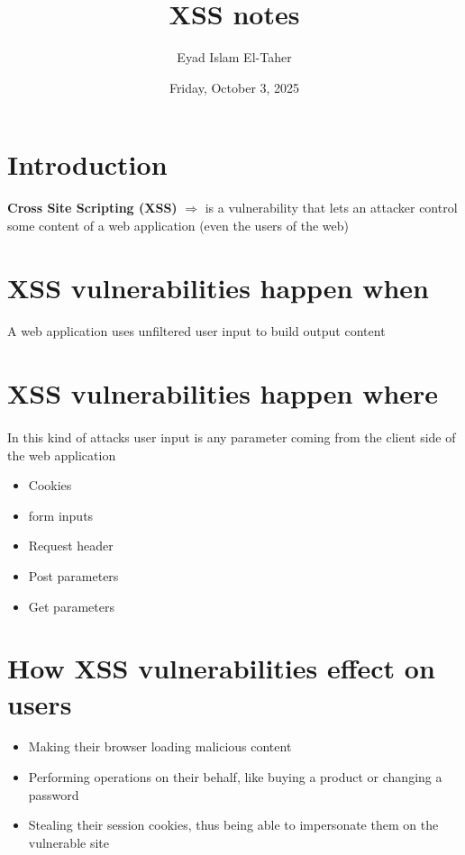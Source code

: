\documentclass{article}
\title{XSS notes}
\date{Friday, October 3, 2025}
\author{Eyad Islam El-Taher}
\begin{document}
\maketitle

\section*{Introduction}
\textbf {Cross Site Scripting (XSS)} $\Longrightarrow$ is a vulnerability that lets an attacker control some content of a web application (even the users of the web)

\section*{XSS vulnerabilities happen when}
\paragraph{}
A web application uses unfiltered user input to build output content

\section*{XSS vulnerabilities happen where}
\paragraph{}
In this kind of attacks user input is any parameter coming from the client side
of the web application

\begin{multicols}{2}
    \begin{itemize}
        \item Cookies
        \item form inputs
        \item Request header
        \item Post parameters
        \item Get parameters
    \end{itemize}
\end{multicols}

\section*{How XSS vulnerabilities effect on users}

\begin{itemize}
    \item Making their browser loading malicious content
    \item Performing operations on their behalf, like buying a product or changing a
          password
    \item Stealing their session cookies, thus being able to impersonate them on the
          vulnerable site
\end{itemize}
\end{document}
